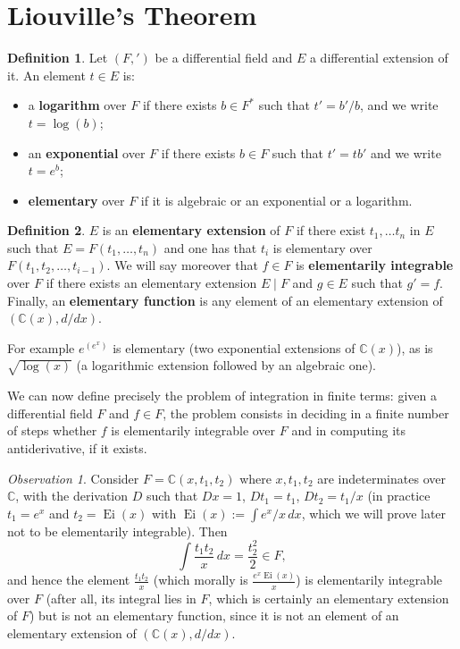 \documentclass[11pt]{article}
\theoremstyle{plain}
\theoremstyle{definition}
\newtheorem{definition}{Definition}
\theoremstyle{remark}
\newtheorem*{observation}{Observation}
\newcommand{\C}{\mathbb{C}}
\newcommand{\Ei}{\operatorname{Ei}}
\begin{document}
\section{Liouville's Theorem}

\begin{definition}\label{def:logexp}
Let $(F, ')$ be a differential field and $E$ a differential extension
of it. An element $t \in E$ is:
\begin{itemize}
\item a \textbf{logarithm} over $F$ if there exists $b \in F^{*}$ such
that $t' = b'/b$, and we write $t = \log(b)$;
\item an \textbf{exponential} over $F$ if there exists $b \in F$ such
that $t' = t b'$ and we write $t = e^{b}$;
\item \textbf{elementary} over $F$ if it is algebraic or an exponential
or a logarithm.
\end{itemize}
\end{definition}

\begin{definition}\label{def:elemext}
$E$ is an \textbf{elementary extension} of $F$ if there exist
$t_{1}, \ldots t_{n}$ in $E$ such that $E = F(t_{1}, \ldots, t_{n})$ and
one has that $t_{i}$ is elementary over
$F(t_{1}, t_{2}, \ldots, t_{i-1})$. We will say moreover that
$f \in F$ is \textbf{elementarily integrable} over $F$ if there exists
an elementary extension $E\mid F$ and $g \in E$ such that $g' = f$.
Finally, an \textbf{elementary function} is any element of an
elementary extension of $(\C(x), d/dx)$.
\end{definition}

For example $e^{(e^{x})}$ is elementary (two exponential extensions of
$\C(x)$), as is $\sqrt{\log(x)}$ (a logarithmic extension followed by
an algebraic one).

We can now define precisely the problem of integration in finite
terms: given a differential field $F$ and $f \in F$, the problem
consists in deciding in a finite number of steps whether $f$ is
elementarily integrable over $F$ and in computing its antiderivative,
if it exists.

\begin{observation}
Consider $F = \C(x, t_{1}, t_{2})$ where $x, t_{1}, t_{2}$ are
indeterminates over $\C$, with the derivation $D$ such that $Dx = 1$,
$Dt_{1} = t_{1}$, $Dt_{2} = t_{1}/x$ (in practice $t_{1} = e^{x}$ and
$t_{2} = \Ei(x)$ with $\Ei(x) := \int e^{x}/x\, dx$, which we will
prove later not to be elementarily integrable). Then
\[
\int \frac{t_{1} t_{2}}{x}\, dx = \frac{t_{2}^{2}}{2} \in F,
\]
and hence the element $\frac{t_{1} t_{2}}{x}$ (which morally is
$\frac{e^{x} \Ei(x)}{x}$) is elementarily integrable over $F$ (after
all, its integral lies in $F$, which is certainly an elementary
extension of $F$) but is not an elementary function, since it is not an
element of an elementary extension of $(\C(x), d/dx)$.
\end{observation}
\end{document}
